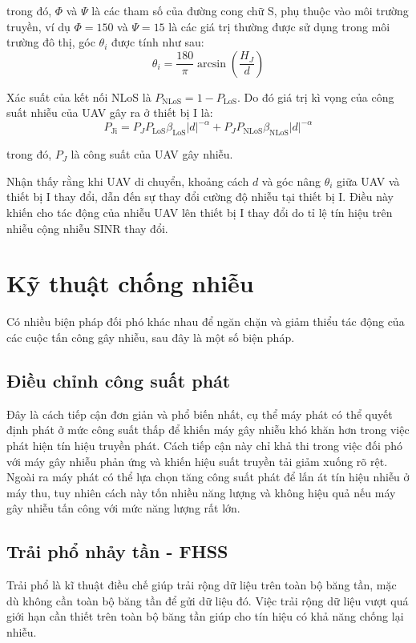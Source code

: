 \documentclass{uetgraduation}
\begin{document}
trong đó, $\Phi$ và $\Psi$ là các tham số của đường cong chữ S, phụ thuộc vào môi trường truyền, ví dụ $\Phi = 150$ và $\Psi =15$ là các giá trị thường được sử dụng trong
môi trường đô thị, góc $\theta_i$ được tính như sau:
\begin{equation}
    \theta_i = \frac{180}{\pi} \arcsin(\frac{H_J}{d})
    \label{eq:elevation_angle}
\end{equation}

Xác suất của kết nối NLoS là $P_\text{NLoS} = 1 - P_\text{LoS}$. Do đó giá trị kì vọng của công suất nhiễu của UAV gây ra ở thiết bị I là:
\begin{equation}
    P_\text{Ji} = P_J P_\text{LoS} \beta_\text{LoS} |d|^{-\alpha} + P_J P_\text{NLoS} \beta_\text{NLoS} |d|^{-\alpha}
    \label{eq:p_noise_uav}
\end{equation}

trong đó, $P_J$ là công suất của UAV gây nhiễu.

Nhận thấy rằng khi UAV di chuyển, khoảng cách $d$ và góc nâng $\theta_i$ giữa UAV và thiết bị I thay đổi, dẫn đến sự thay đổi cường độ nhiễu tại thiết bị I.
Điều này khiến cho tác động của nhiễu UAV lên thiết bị I thay đổi do tỉ lệ tín hiệu trên nhiễu cộng nhiễu SINR thay đổi.

\section{Kỹ thuật chống nhiễu}
Có nhiều biện pháp đối phó khác nhau để ngăn chặn và giảm thiểu tác động của các cuộc tấn công gây nhiễu, sau đây là một số biện pháp.

\subsection{Điều chỉnh công suất phát}
Đây là cách tiếp cận đơn giản và phổ biến nhất, cụ thể máy phát có thể quyết định phát ở mức công suất thấp để khiến máy gây nhiễu khó khăn hơn trong việc phát hiện
tín hiệu truyền phát. Cách tiếp cận này chỉ khả thi trong việc đối phó với máy gây nhiễu phản ứng và khiến hiệu suất truyền tải giảm xuống rõ rệt. Ngoài ra máy phát
có thể lựa chọn tăng công suất phát để lấn át tín hiệu nhiễu ở máy thu, tuy nhiên cách này tốn nhiều năng lượng và không hiệu quả nếu máy gây nhiễu tấn công với mức
năng lượng rất lớn.

\subsection{Trải phổ nhảy tần - FHSS}
Trải phổ là kĩ thuật điều chế giúp trải rộng dữ liệu trên toàn bộ băng tần, mặc dù không cần toàn bộ băng tần để gửi dữ liệu đó. Việc trải rộng dữ liệu vượt quá giới
hạn cần thiết trên toàn bộ băng tần giúp cho tín hiệu có khả năng chống lại nhiễu.
\end{document}

